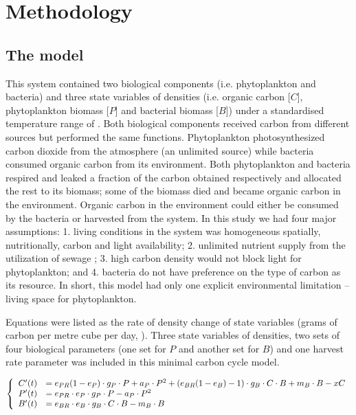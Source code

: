 \documentclass[../thesis.tex]{subfiles} %
\begin{document}
\section{Methodology}

\subsection{The model}

This system contained two biological components (i.e. phytoplankton and bacteria) and three state variables of densities (i.e. organic carbon [$C$], phytoplankton biomass [$P$] and bacterial biomass [$B$]) under a standardised temperature range of \temp.  Both biological components received carbon from different sources but performed the same functions. Phytoplankton photosynthesized carbon dioxide from the atmosphere (an unlimited source) while bacteria consumed organic carbon from its environment.  Both phytoplankton and bacteria respired and leaked a fraction of the carbon obtained respectively and allocated the rest to its biomass; some of the biomass died and became organic carbon in the environment.  Organic carbon in the environment could either be consumed by the bacteria or harvested from the system.  In this study we had four major assumptions: 1. living conditions in the system was homogeneous spatially, nutritionally, carbon and light availability; 2. unlimited nutrient supply from the utilization of sewage \autocite{markou2014microalgal}; 3. high carbon density would not block light for phytoplankton; and 4. bacteria do not have preference on the type of carbon as its resource.  In short, this model had only one explicit environmental limitation -- living space for phytoplankton.

Equations were listed as the rate of density change of state variables (grams of carbon per metre cube per day, \dxdt).  Three state variables of densities, two sets of four biological parameters (one set for $P$ and another set for $B$) and one harvest rate parameter was included in this minimal carbon cycle model.

\begin{equation}\left\{\begin{array}{rl}
    C'(t) &= e_{PR}(1-e_P)\cdot g_P\cdot P +a_P\cdot P^2 +(e_{BR}(1-e_B)-1)\cdot g_B\cdot C\cdot B +m_B\cdot B -xC\\
    P'(t) &= e_{PR}\cdot e_P\cdot g_P\cdot P -a_P\cdot P^2\\
    B'(t) &= e_{BR}\cdot e_B\cdot g_B\cdot C\cdot B -m_B\cdot B
\end{array}\right.\label{eq:PBH}\end{equation}
\end{document}
